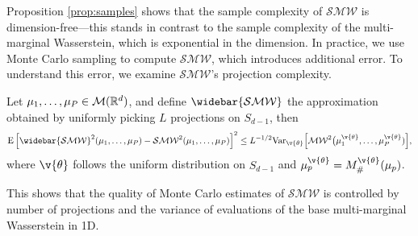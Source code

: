 
Proposition \ref{prop:samples} shows that the sample complexity of $\mathcal{SMW}$ is dimension-free---this stands in contrast to the sample complexity of the multi-marginal Wasserstein, which is exponential in the dimension.
%
In practice, we use Monte Carlo sampling to compute $\mathcal{SMW}$, which introduces additional error.
To understand this error, we examine $\mathcal{SMW}$'s projection complexity.

\begin{proposition}
	\label{prop:projectioncomplexity}
	Let $\mu_1,\ldots,\mu_P \in \mathcal{M}(\mathbb{R}^d)$, and define $\widebar{\mathcal{SMW}}$ the approximation obtained by uniformly picking $L$ projections on $S_{d-1}$, then
	\[ 
	\E\left[ \widebar{\mathcal{SMW}}^2(\mu_1,\ldots,\mu_P) - \mathcal{SMW}^2(\mu_1,\ldots,\mu_P)\right]^2
	\leq 
	L^{-1/2}\Var_{\v{\theta}}\Big[\mathcal{MW}^2\big(\mu_1^{\v{\theta}},\ldots,\mu_P^{\v{\theta}})\Big],%
	\]
	where  $\v{\theta}$ follows the uniform distribution on $S_{d-1}$ and $\mu_p^{\v{\theta}} = M_{\#}^{\v{\theta}}(\mu_p)$.
	
\end{proposition}


This shows that the quality of Monte Carlo estimates of $\mathcal{SMW}$ is controlled by number of projections and the variance of evaluations of the base multi-marginal Wasserstein in 1D.
